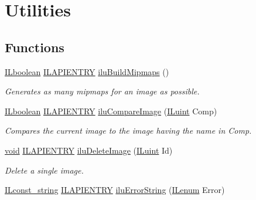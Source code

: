 \hypertarget{group__ilu__util}{\section{Utilities}
\label{group__ilu__util}
}
\subsection*{Functions}
\begin{DoxyCompactItemize}
\item 
\hyperlink{group__il__types_gaa6aa7c95cfdc06b4d8601ef832b7bb0a}{I\+Lboolean} \hyperlink{_i_l_8h_a69c08a8d06df986f7e46f209d131ef2f}{I\+L\+A\+P\+I\+E\+N\+T\+R\+Y} \hyperlink{group__ilu__util_ga7a8bbd9d1eae3c620a937b6cde501d38}{ilu\+Build\+Mipmaps} ()
\begin{DoxyCompactList}\small\item\em Generates as many mipmaps for an image as possible. \end{DoxyCompactList}\item 
\hyperlink{group__il__types_gaa6aa7c95cfdc06b4d8601ef832b7bb0a}{I\+Lboolean} \hyperlink{_i_l_8h_a69c08a8d06df986f7e46f209d131ef2f}{I\+L\+A\+P\+I\+E\+N\+T\+R\+Y} \hyperlink{group__ilu__util_gab39876b316fc278f23c3a62bb085eb48}{ilu\+Compare\+Image} (\hyperlink{group__il__types_gaff8e86a1072c8d7cfe387fb87c6ed8e1}{I\+Luint} Comp)
\begin{DoxyCompactList}\small\item\em Compares the current image to the image having the name in Comp. \end{DoxyCompactList}\item 
\hyperlink{_i_l_8h_a5530e04d947bcddd83639ea7940faf10}{void} \hyperlink{_i_l_8h_a69c08a8d06df986f7e46f209d131ef2f}{I\+L\+A\+P\+I\+E\+N\+T\+R\+Y} \hyperlink{group__ilu__util_gaf642c38dac816854d145940b5b0183ff}{ilu\+Delete\+Image} (\hyperlink{group__il__types_gaff8e86a1072c8d7cfe387fb87c6ed8e1}{I\+Luint} Id)
\begin{DoxyCompactList}\small\item\em Delete a single image. \end{DoxyCompactList}\item 
\hyperlink{group__il__types_ga1aa1edc3eb344e14acacb02bade24a5a}{I\+Lconst\+\_\+string} \hyperlink{_i_l_8h_a69c08a8d06df986f7e46f209d131ef2f}{I\+L\+A\+P\+I\+E\+N\+T\+R\+Y} \hyperlink{group__ilu__util_gaa899a04791dfb88d8b48c823998af427}{ilu\+Error\+String} (\hyperlink{group__il__types_ga62ca73445716183ef42b1f3906a45ed0}{I\+Lenum} Error)

\end{DoxyCompactItemize}
